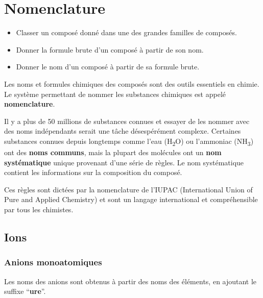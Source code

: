 \documentclass[
  11pt,
  a4paper,
  openany]{book}
\providecommand{\tightlist}{%
  \setlength{\itemsep}{0pt}\setlength{\parskip}{0pt}}
\begin{document}
\chapter{Nomenclature}\label{nomenclature}

\begin{objectives}

\begin{itemize}
\tightlist
\item
  Classer un composé donné dans une des grandes familles de composés.
\item
  Donner la formule brute d'un composé à partir de son nom.
\item
  Donner le nom d'un composé à partir de sa formule brute.
\end{itemize}

\end{objectives}

Les noms et formules chimiques des composés sont des outils essentiels en chimie. Le système permettant de nommer les substances chimiques est appelé \textbf{nomenclature}.

Il y a plus de 50 millions de substances connues et essayer de les nommer avec des noms indépendants serait une tâche désespérément complexe. Certaines substances connues depuis longtemps comme l'eau (H\textsubscript{2}O) ou l'ammoniac (NH\textsubscript{3}) ont des \textbf{noms communs}, mais la plupart des molécules ont un \textbf{nom systématique} unique provenant d'une série de règles. Le nom systématique contient les informations sur la composition du composé.

Ces règles sont dictées par la nomenclature de l'IUPAC (International Union of Pure and Applied Chemistry) et sont un langage international et compréhensible par tous les chimistes.

\section{Ions}\label{ions}

\subsection{Anions monoatomiques}\label{anions-monoatomiques}

Les noms des anions sont obtenus à partir des noms des éléments, en ajoutant le suffixe ``\textbf{ure}''.
\end{document}
